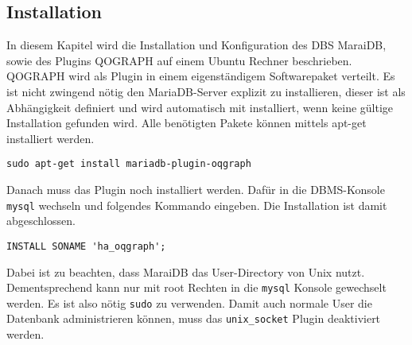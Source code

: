 \subsection{Installation}\label{Installation}
In diesem Kapitel wird die Installation und Konfiguration des DBS MaraiDB, sowie des Plugins QOGRAPH auf einem Ubuntu Rechner beschrieben.  
QOGRAPH wird als Plugin in einem eigenständigem Softwarepaket verteilt. Es ist nicht zwingend nötig den MariaDB-Server explizit zu installieren, dieser ist als Abhängigkeit definiert und wird automatisch mit installiert, wenn keine gültige Installation gefunden wird. Alle benötigten Pakete können mittels apt-get installiert werden.
\begin{lstlisting}
sudo apt-get install mariadb-plugin-oqgraph
\end{lstlisting}
Danach muss das Plugin noch installiert werden. Dafür in die DBMS-Konsole \texttt{mysql} wechseln und folgendes Kommando eingeben. Die Installation ist damit abgeschlossen.
\begin{lstlisting}
INSTALL SONAME 'ha_oqgraph';
\end{lstlisting}

Dabei ist zu beachten, dass MaraiDB das User-Directory von Unix nutzt. Dementsprechend kann nur mit root Rechten in die \texttt{mysql} Konsole  gewechselt werden. Es ist also nötig \texttt{sudo} zu verwenden. Damit auch normale User die Datenbank administrieren können, muss das \texttt{unix\_socket} Plugin deaktiviert werden.

